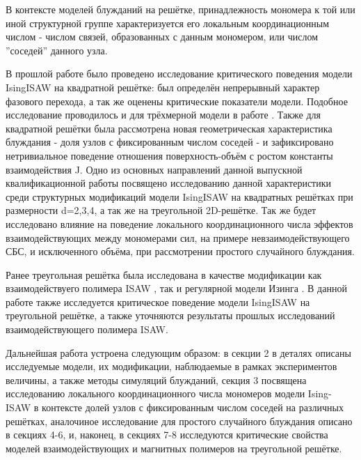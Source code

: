 В контексте моделей блужданий на решётке, принадлежность мономера к той или иной структурной группе характеризуется его локальным координационным числом - числом связей, образованных с данным мономером, или числом ''соседей'' данного узла. 

В прошлой работе \cite{faizullina2021critical} было проведено исследование критического поведения модели IsingISAW на квадратной решётке: 
был определён непрерывный характер фазового перехода, а так же оценены критические показатели модели.
Подобное исследование проводилось и для трёхмерной модели в работе \cite{foster2021critical}.
Также для квадратной решётки была рассмотрена новая геометрическая характеристика блуждания - доля узлов с фиксированным числом соседей - и зафиксировано нетривиальное поведение отношения поверхность-объём с ростом константы взаимодействия J.
Одно из основных направлений данной выпускной квалификационной работы посвящено исследованию данной характеристики среди 
структурных модификаций модели IsingISAW на квадратных решётках при размерности d=2,3,4, а так же на треугольной 2D-решётке.
Так же будет исследовано влияние на поведение локального координационного числа эффектов взаимодействующих между мономерами сил, на примере невзаимодействующего СБС, и исключенного объёма, при рассмотрении простого случайного блуждания.

Ранее треугольная решётка была исследована в качестве модификации как взаимодействуего полимера ISAW \cite{Privman1986}, 
так и регулярной модели Изинга \cite{ShchurTriangle, selke2006critical}. 
В данной работе также исследуется критическое поведение модели IsingISAW на треугольной решётке, а также уточняются результаты прошлых исследований взаимодействующего полимера ISAW.

Дальнейшая работа устроена следующим образом:
в секции 2 в деталях описаны исследуемые модели, их модификации, наблюдаемые в рамках экспериментов величины, а также методы симуляций блужданий,
секция 3 посвящена исследованию локального координационного числа мономеров модели Ising-ISAW в контексте долей узлов с фиксированным числом соседей на различных решётках,
аналочиное исследование для простого случайного блуждания описано в секциях 4-6,
и, наконец, в секциях 7-8 исследуются критические свойства моделей взаимодействующих и магнитных полимеров на треугольной решётке.
